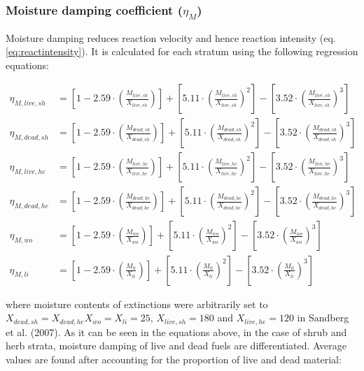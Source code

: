 \documentclass[]{book}
\begin{document}
\subsubsection{\texorpdfstring{Moisture damping coefficient
(\(\eta_M\))}{Moisture damping coefficient (\textbackslash{}eta\_M)}}\label{moisture-damping-coefficient-eta_m}

Moisture damping reduces reaction velocity and hence reaction intensity
(eq. \eqref{eq:reactintensity}). It is calculated for each stratum using
the following regression equations:

\begin{eqnarray}
\eta_{M, live, sh} &= \left[1-2.59\cdot \left(\frac{M_{live, sh}}{X_{live, sh}}\right)\right] +\left[ 5.11\cdot \left(\frac{M_{live, sh}}{X_{live, sh}}\right)^2\right]-\left[ 3.52\cdot \left(\frac{M_{live, sh}}{X_{live, sh}}\right)^3\right] \\
\eta_{M, dead, sh} &= \left[1-2.59\cdot \left(\frac{M_{dead, sh}}{X_{dead, sh}}\right)\right] +\left[ 5.11\cdot \left(\frac{M_{dead, sh}}{X_{dead, sh}}\right)^2\right]-\left[ 3.52\cdot \left(\frac{M_{dead, sh}}{X_{dead, sh}}\right)^3\right] \\
\eta_{M, live, he} &= \left[1-2.59\cdot \left(\frac{M_{live, he}}{X_{live, he}}\right)\right] +\left[ 5.11\cdot \left(\frac{M_{live, he}}{X_{live, he}}\right)^2\right]-\left[ 3.52\cdot \left(\frac{M_{live, he}}{X_{live, he}}\right)^3\right] \\
\eta_{M, dead, he} &= \left[1-2.59\cdot \left(\frac{M_{dead, he}}{X_{dead, he}}\right)\right] +\left[ 5.11\cdot \left(\frac{M_{dead, he}}{X_{dead, he}}\right)^2\right]-\left[ 3.52\cdot \left(\frac{M_{dead, he}}{X_{dead, he}}\right)^3\right] \\
\eta_{M, wo} &= \left[1-2.59\cdot \left(\frac{M_{wo}}{X_{wo}}\right)\right] +\left[ 5.11\cdot \left(\frac{M_{wo}}{X_{wo}}\right)^2\right]-\left[ 3.52\cdot \left(\frac{M_{wo}}{X_{wo}}\right)^3\right] \\
\eta_{M, li} &= \left[1-2.59\cdot \left(\frac{M_{li}}{X_{li}}\right)\right] +\left[ 5.11\cdot \left(\frac{M_{li}}{X_{li}}\right)^2\right]-\left[ 3.52\cdot \left(\frac{M_{li}}{X_{li}}\right)^3\right] 
\label{eq:moistdamp}
\end{eqnarray}

where moisture contents of extinctions were arbitrarily set to
\(X_{dead, sh} = X_{dead, he} X_{wo} = X_{li} = 25\),
\(X_{live, sh} = 180\) and \(X_{live, he} = 120\) in Sandberg et al.
(2007). As it can be seen in the equations above, in the case of shrub
and herb strata, moisture damping of live and dead fuels are
differentiated. Average values are found after accounting for the
proportion of live and dead material:
\end{document}
